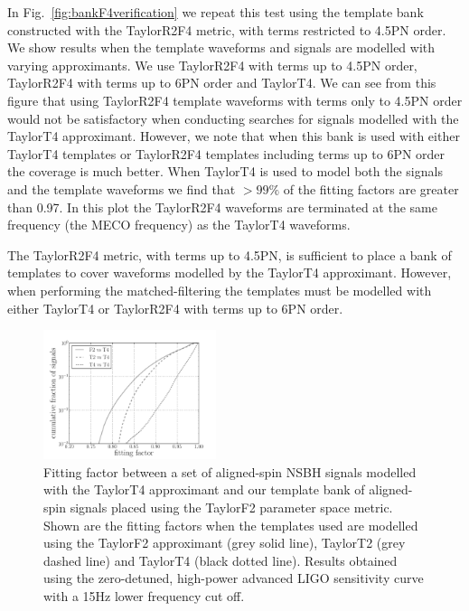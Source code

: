 In Fig.~\ref{fig:bankF4verification} we repeat this test using
the template bank constructed with the TaylorR2F4 metric, with terms restricted
to 4.5\ac{PN} order. We show results when the template waveforms and signals
are modelled with varying approximants. We use TaylorR2F4 with terms up to
4.5\ac{PN} order, TaylorR2F4 with terms up to 6\ac{PN} order and TaylorT4.
We can see from this figure that using TaylorR2F4 template waveforms
with terms only to 4.5\ac{PN} order would not be satisfactory when conducting
searches for signals modelled with the TaylorT4 approximant. However, we note
that when this bank is used with either TaylorT4 templates or TaylorR2F4
templates including terms up to 6\ac{PN} order the coverage is much better.
When TaylorT4 is used to model both the signals and the template waveforms we
find that $>99\%$ of the fitting factors are greater than
0.97. In this plot the TaylorR2F4 waveforms are terminated at
the same frequency (the \ac{MECO} frequency) as the TaylorT4 waveforms.

The TaylorR2F4 metric, with terms up to
4.5\ac{PN}, is sufficient to place
a bank of templates to cover waveforms modelled by the TaylorT4 approximant.
However, when performing the
matched-filtering the templates must be modelled with either TaylorT4 or
TaylorR2F4 with terms up to 6\ac{PN} order.

\begin{figure}
\begin{center}
\includegraphics[width=0.45\textwidth]
{papers/nsbh_effectualness/figure5.pdf}
\end{center}
\caption{\label{fig:bankF2T4testing}
Fitting factor between a set of aligned-spin \ac{NSBH} signals modelled with the
TaylorT4 approximant and our template bank of aligned-spin signals placed using
the TaylorF2 parameter space metric. Shown are the fitting factors when the
templates used are modelled using the TaylorF2 approximant (grey solid line),
TaylorT2 (grey dashed line) and TaylorT4 (black dotted line). Results obtained
using the zero-detuned, high-power advanced LIGO sensitivity curve with a 15Hz
lower frequency cut off.
}
\end{figure}

